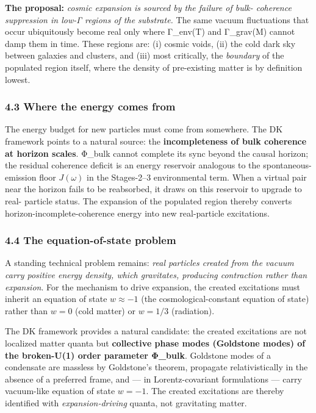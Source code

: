 \documentclass[
]{article}
\begin{document}
\textbf{The proposal:} \emph{cosmic expansion is sourced by the failure
of bulk- coherence suppression in low-Γ regions of the substrate.} The
same vacuum fluctuations that occur ubiquitously become real only where
Γ\_env(T) and Γ\_grav(M) cannot damp them in time. These regions are:
(i) cosmic voids, (ii) the cold dark sky between galaxies and clusters,
and (iii) most critically, the \emph{boundary} of the populated region
itself, where the density of pre-existing matter is by definition
lowest.

\subsubsection{4.3 Where the energy comes
from}\label{where-the-energy-comes-from}

The energy budget for new particles must come from somewhere. The DK
framework points to a natural source: the \textbf{incompleteness of bulk
coherence at horizon scales}. Φ\_bulk cannot complete its sync beyond
the causal horizon; the residual coherence deficit is an energy
reservoir analogous to the spontaneous-emission floor \(J(\omega)\) in
the Stages-2--3 environmental term. When a virtual pair near the horizon
fails to be reabsorbed, it draws on this reservoir to upgrade to real-
particle status. The expansion of the populated region thereby converts
horizon-incomplete-coherence energy into new real-particle excitations.

\subsubsection{4.4 The equation-of-state
problem}\label{the-equation-of-state-problem}

A standing technical problem remains: \emph{real particles created from
the vacuum carry positive energy density, which gravitates, producing
contraction rather than expansion}. For the mechanism to drive
expansion, the created excitations must inherit an equation of state
\(w \approx -1\) (the cosmological-constant equation of state) rather
than \(w = 0\) (cold matter) or \(w = 1/3\) (radiation).

The DK framework provides a natural candidate: the created excitations
are not localized matter quanta but \textbf{collective phase modes
(Goldstone modes) of the broken-U(1) order parameter Φ\_bulk}. Goldstone
modes of a condensate are massless by Goldstone's theorem, propagate
relativistically in the absence of a preferred frame, and --- in
Lorentz-covariant formulations --- carry vacuum-like equation of state
\(w = -1\). The created excitations are thereby identified with
\emph{expansion-driving} quanta, not gravitating matter.
\end{document}
